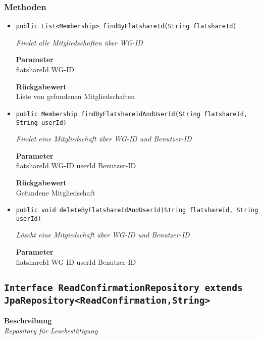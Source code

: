     \subsubsection*{Methoden}
    \begin{itemize}
    	\item{\texttt{public List<Membership> findByFlatshareId(String flatshareId)}}
    	
    	\textit{Findet alle Mitgliedschaften über WG-ID}
    	
    	\textbf{Parameter} \\
    	flatshareId WG-ID
    	
    	\textbf{Rückgabewert} \\
    	Liste von gefundenen Mitgliedschaften        \item{\texttt{public Membership findByFlatshareIdAndUserId(String flatshareId, String userId)}}
    	
    	\textit{Findet eine Mitgliedschaft über WG-ID und Benutzer-ID}
    	
    	\textbf{Parameter} \\
    	flatshareId WG-ID
    	userId Benutzer-ID
    	
    	\textbf{Rückgabewert} \\
    	Gefundene Mitgliedschaft        \item{\texttt{public void deleteByFlatshareIdAndUserId(String flatshareId, String userId)}}
    	
    	\textit{Löscht eine Mitgiedschaft über WG-ID und Benutzer-ID}
    	
    	\textbf{Parameter} \\
    	flatshareId WG-ID
    	userId Benutzer-ID
    	
    	
    \end{itemize}
    \subsection{\texttt{Interface ReadConfirmationRepository extends JpaRepository<ReadConfirmation,String>}}
    \textbf{Beschreibung} \\
    \textit{Repository für Lesebestätigung}
